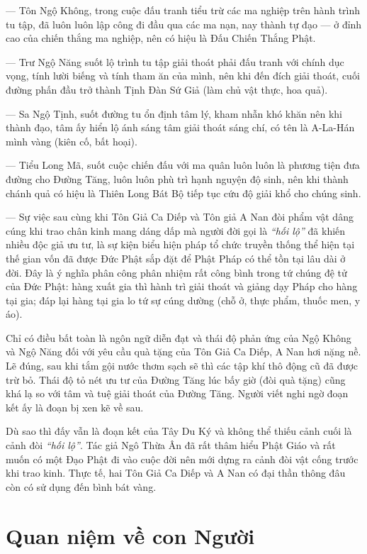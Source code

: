 — Tôn Ngộ Không, trong cuộc đấu tranh tiểu trừ các ma nghiệp trên hành trình tu tập, đã luôn luôn lập công đi đầu qua các ma nạn, nay thành tự đạo — ở đỉnh cao của chiến thắng ma nghiệp, nên có hiệu là Đấu Chiến Thắng Phật.

— Trư Ngộ Năng suốt lộ trình tu tập giải thoát phải đấu tranh với chính dục vọng, tính lười biếng và tính tham ăn của mình, nên khi đến đích giải thoát, cuối đường phấn đầu trở thành Tịnh Đàn Sứ Giả (làm chủ vật thực, hoa quả).

— Sa Ngộ Tịnh, suốt đường tu ổn định tâm lý, kham nhẫn khó khăn nên khi thành đạo, tâm ấy hiển lộ ánh sáng tâm giải thoát sáng chí, có tên là A-La-Hán mình vàng (kiên cố, bất hoại).

— Tiểu Long Mã, suốt cuộc chiến đấu với ma quân luôn luôn là phương tiện đưa đường cho Đường Tăng, luôn luôn phù trì hạnh nguyện độ sinh, nên khi thành chánh quả có hiệu là Thiên Long Bát Bộ tiếp tục cứu độ giải khổ cho chúng sinh.

— Sự việc sau cùng khi Tôn Giả Ca Diếp và Tôn giả A Nan đòi phẩm vật dâng cúng khi trao chân kinh mang dáng dấp mà người đời gọi là \emph{``hối lộ''} đã khiến nhiều độc giả ưu tư, là sự kiện biểu hiện pháp tổ chức truyền thống thể hiện tại thế gian vốn đã được Đức Phật sắp đặt để Phật Pháp có thể tồn tại lâu dài ở đời. Đây là ý nghĩa phân công phân nhiệm rất công bình trong tứ chúng đệ tử của Đức Phật: hàng xuất gia thì hành trì giải thoát và giảng dạy Pháp cho hàng tại gia; đáp lại hàng tại gia lo tứ sự cúng dường (chỗ ở, thực phẩm, thuốc men, y áo).

Chỉ có điều bất toàn là ngôn ngữ diễn đạt và thái độ phản ứng của Ngộ Không và Ngộ Năng đối với yêu cầu quà tặng của Tôn Giả Ca Diếp, A Nan hơi nặng nề. Lẽ đúng, sau khi tắm gội nước thơm sạch sẽ thì các tập khí thô động cũ đã được trừ bỏ. Thái độ tỏ nét ưu tư của Đường Tăng lúc bấy giờ (đòi quà tặng) cũng khá lạ so với tâm và tuệ giải thoát của Đường Tăng. Người viết nghi ngờ đoạn kết ấy là đoạn bị xen kẽ về sau.

Dù sao thì đấy vẫn là đoạn kết của Tây Du Ký và không thể thiếu cảnh cuối là cảnh đòi \emph{``hối lộ''}. Tác giả Ngô Thừa Ân đã rất thâm hiểu Phật Giáo và rất muốn có một Đạo Phật đi vào cuộc đời nên mới dựng ra cảnh đòi vật cống trước khi trao kinh. Thực tế, hai Tôn Giả Ca Diếp và A Nan có đại thần thông đâu còn có sử dụng đến bình bát vàng.

\section{Quan niệm về con Người} %
\label{sec:98_99_100_con_nguoi}

